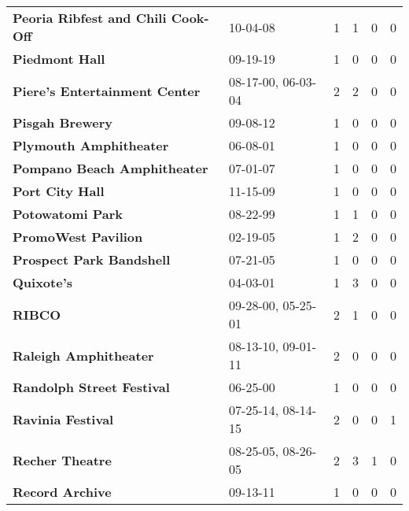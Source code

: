 \begin{supertabular}{p{0.4\textwidth}p{0.3\textwidth}p{0.05\textwidth}p{0.05\textwidth}p{0.05\textwidth}p{0.05\textwidth}}
                           \textbf{Peoria Ribfest and Chili Cook-Off} &            10-04-08 &  1 &  1 &  0 &  0 \\
                                               \textbf{Piedmont Hall} &            09-19-19 &  1 &  0 &  0 &  0 \\
                                \textbf{Piere's Entertainment Center} &  08-17-00, 06-03-04 &  2 &  2 &  0 &  0 \\
                                              \textbf{Pisgah Brewery} &            09-08-12 &  1 &  0 &  0 &  0 \\
                                       \textbf{Plymouth Amphitheater} &            06-08-01 &  1 &  0 &  0 &  0 \\
                                  \textbf{Pompano Beach Amphitheater} &            07-01-07 &  1 &  0 &  0 &  0 \\
                                              \textbf{Port City Hall} &            11-15-09 &  1 &  0 &  0 &  0 \\
                                             \textbf{Potowatomi Park} &            08-22-99 &  1 &  1 &  0 &  0 \\
                                          \textbf{PromoWest Pavilion} &            02-19-05 &  1 &  2 &  0 &  0 \\
                                     \textbf{Prospect Park Bandshell} &            07-21-05 &  1 &  0 &  0 &  0 \\
                                                   \textbf{Quixote's} &            04-03-01 &  1 &  3 &  0 &  0 \\
                                                       \textbf{RIBCO} &  09-28-00, 05-25-01 &  2 &  1 &  0 &  0 \\
                                        \textbf{Raleigh Amphitheater} &  08-13-10, 09-01-11 &  2 &  0 &  0 &  0 \\
                                    \textbf{Randolph Street Festival} &            06-25-00 &  1 &  0 &  0 &  0 \\
                                            \textbf{Ravinia Festival} &  07-25-14, 08-14-15 &  2 &  0 &  0 &  1 \\
                                              \textbf{Recher Theatre} &  08-25-05, 08-26-05 &  2 &  3 &  1 &  0 \\
                                              \textbf{Record Archive} &            09-13-11 &  1 &  0 &  0 &  0 \\

\end{supertabular}
